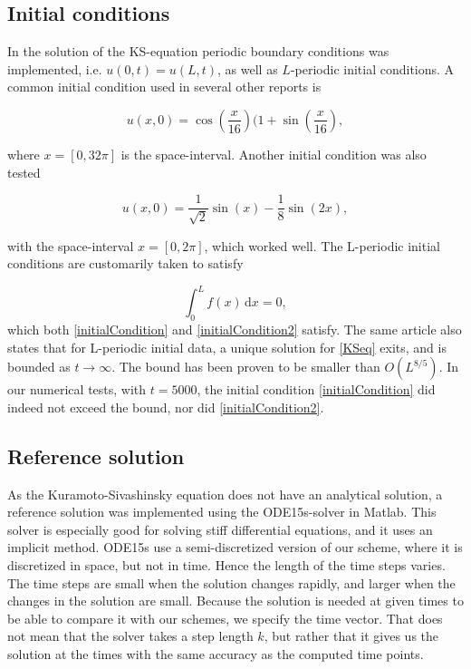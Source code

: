 \subsection{Initial conditions}
In the solution of the KS-equation periodic boundary conditions was implemented, i.e. $u(0,t) = u(L,t)$, as well as $L$-periodic initial conditions. A common initial condition used in several other reports is

\begin{equation}
\label{initialCondition}
u(x,0) = \cos(\frac{x}{16})(1 + \sin(\frac{x}{16}),
\end{equation}

where $x = [0, 32\pi]$ is the space-interval. Another initial condition was also tested

\begin{equation}
\label{initialCondition2}
u(x,0) = \frac{1}{\sqrt{2}} \sin(x) - \frac{1}{8}\sin(2x),
\end{equation}

with the space-interval $x = [0, 2\pi]$, which worked well. The L-periodic initial conditions are customarily taken \cite{periodicInitial} to satisfy

\begin{equation}
\int_0^L\! f(x)\,\textrm{d}x = 0,
\end{equation}
which both \eqref{initialCondition} and \eqref{initialCondition2} satisfy. The same article also states that for L-periodic initial data, a unique solution for \eqref{KSeq} exits, and is bounded as $t\rightarrow\infty$. The bound has been proven to be smaller than $O(L^{8/5})$. In our numerical tests, with $t=5000$, the initial condition \eqref{initialCondition} did indeed not exceed the bound, nor did \eqref{initialCondition2}.

\subsection{Reference solution}
As the Kuramoto-Sivashinsky equation does not have an analytical solution, a reference solution was implemented using the ODE15s-solver in Matlab. This solver is especially good for solving stiff differential equations, and it uses an implicit method. ODE15s use a semi-discretized version of our scheme, where it is discretized in space, but not in time. Hence the length of the time steps varies. The time steps are small when the solution changes rapidly, and larger when the changes in the solution are small. Because the solution is needed at given times to be able to compare it with our schemes, we specify the time vector. That does not mean that the solver takes a step length $k$, but rather that it gives us the solution at the times with the same accuracy as the computed time points. \cite{ode15s}


